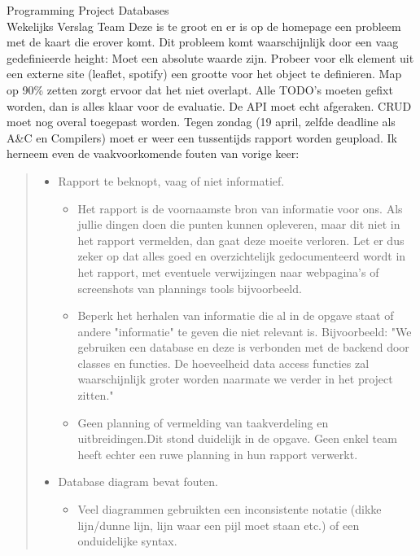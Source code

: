\documentclass{article}
\newcounter{team}
\begin{document}
\begin{Minutes}{Programming Project Databases \\ Wekelijks Verslag Team }
				    Deze is te groot en er is op de homepage een probleem met de kaart die erover komt. Dit probleem komt waarschijnlijk door een vaag gedefinieerde height: Moet een absolute waarde zijn. Probeer voor elk element uit een externe site (leaflet, spotify) een grootte voor het object te definieren. Map op 90\% zetten zorgt ervoor dat het niet overlapt.
				    Alle TODO's moeten gefixt worden, dan is alles klaar voor de evaluatie. De API moet echt afgeraken. CRUD moet nog overal toegepast worden.
				    Tegen zondag (19 april, zelfde deadline als A&C en Compilers) moet er weer een tussentijds rapport worden geupload.
				    Ik herneem even de vaakvoorkomende fouten van vorige keer:
				    \begin{quote}
				    \begin{itemize}
				    \item Rapport te beknopt, vaag of niet informatief.
				    \begin{itemize}
				        \item Het rapport is de voornaamste bron van informatie voor ons. Als jullie dingen doen die punten kunnen opleveren, maar dit niet in het rapport vermelden, dan gaat deze moeite verloren. Let er dus zeker op dat alles goed en overzichtelijk gedocumenteerd wordt in het rapport, met eventuele verwijzingen naar webpagina's of screenshots van plannings tools bijvoorbeeld.
                        \item Beperk het herhalen van informatie die al in de opgave staat of andere "informatie" te geven die niet relevant is. Bijvoorbeeld: "We gebruiken een database en deze is verbonden met de backend door classes en functies. De hoeveelheid data access
                        functies zal waarschijnlijk groter worden naarmate we verder in het project zitten."
                        \item Geen planning of vermelding van taakverdeling en uitbreidingen.Dit stond duidelijk in de opgave. Geen enkel team heeft echter een ruwe planning in hun rapport verwerkt.
                    \end{itemize}
                    \item Database diagram bevat fouten.
                    \begin{itemize}
                        \item Veel diagrammen gebruikten een inconsistente notatie (dikke lijn/dunne lijn, lijn waar een pijl moet staan etc.) of een onduidelijke syntax.

\end{itemize}
\end{itemize}
\end{quote}
\end{Minutes}
\end{document}
